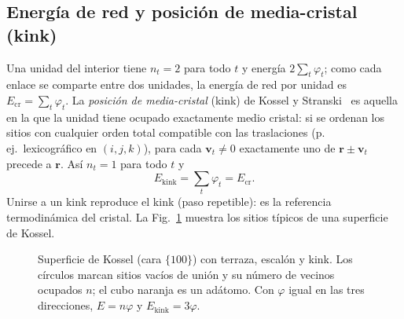 \documentclass[11pt,a4paper]{article}
\newcommand{\vect}[1]{\mathbf{#1}}
\newcommand{\Ekink}{E_{\mathrm{kink}}}
\newcommand{\Ecr}{E_{\mathrm{cr}}}
\newcommand{\cubo}[4]{%
  \filldraw[fill=#4!28,draw=black!75,line width=0.25pt] (#1,#2,#3) -- ++(1,0,0) -- ++(0,0,1) -- ++(-1,0,0) -- cycle;
  \filldraw[fill=#4!10,draw=black!75,line width=0.25pt] (#1,#2,{#3+1}) -- ++(1,0,0) -- ++(0,1,0) -- ++(-1,0,0) -- cycle;
  \filldraw[fill=#4!50,draw=black!75,line width=0.25pt] ({#1+1},#2,#3) -- ++(0,1,0) -- ++(0,0,1) -- ++(0,-1,0) -- cycle;}
\begin{document}
\subsection{Energía de red y posición de media-cristal (kink)}
\label{sec:kink}

Una unidad del interior tiene $n_t=2$ para todo $t$ y energía $2\sum_t\varphi_t$; como cada enlace se
comparte entre dos unidades, la energía de red por unidad es $\Ecr=\sum_t\varphi_t$. La
\emph{posición de media-cristal} (kink) de Kossel y Stranski~\cite{kossel1927,stranski1928} es aquella
en la que la unidad tiene ocupado exactamente medio cristal: si se ordenan los sitios con cualquier
orden total compatible con las traslaciones (p.\,ej.\ lexicográfico en $(i,j,k)$), para cada
$\vect v_t\neq0$ exactamente uno de $\vect r\pm\vect v_t$ precede a $\vect r$. Así $n_t=1$ para todo
$t$ y
\begin{equation}
\Ekink=\sum_t\varphi_t=\Ecr .
\label{eq:kink}
\end{equation}
Unirse a un kink reproduce el kink (paso repetible): es la referencia termodinámica del cristal. La
Fig.~\ref{fig:kossel} muestra los sitios típicos de una superficie de Kossel.

\begin{figure}[t]
\centering
{}
\caption{Superficie de Kossel (cara $\{100\}$) con terraza, escalón y kink. Los círculos marcan sitios
vacíos de unión y su número de vecinos ocupados $n$; el cubo naranja es un adátomo. Con $\varphi$
igual en las tres direcciones, $E=n\varphi$ y $\Ekink=3\varphi$.}
\label{fig:kossel}
\end{figure}
\end{document}
